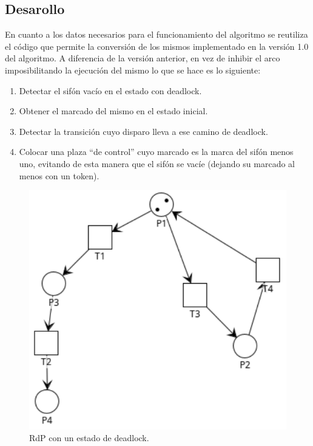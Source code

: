 \subsection{Desarollo}
En cuanto a los datos necesarios para el funcionamiento del algoritmo se reutiliza el código que permite la conversión de los mismos implementado en la versión 1.0 del algoritmo. 
A diferencia de la versión anterior, en vez de inhibir el arco imposibilitando la ejecución del mismo lo que se hace es lo siguiente:
\begin{enumerate}
    \item Detectar el sifón vacío en el estado con deadlock.
    \item Obtener el marcado del mismo en el estado inicial.
    \item Detectar la transición cuyo disparo lleva a ese camino de deadlock.
    \item Colocar una plaza “de control” cuyo marcado es la marca del sifón menos uno, evitando de esta manera que el sifón se vacíe (dejando su marcado al menos con un token).
\end{enumerate}

\begin{figure}[H]
	\centering
	\includegraphics[scale=0.5]{Figures/algoritmo2/1.png}
	\caption{RdP con un estado de deadlock.}
	\label{fig:rdp3.2}
  \end{figure}

